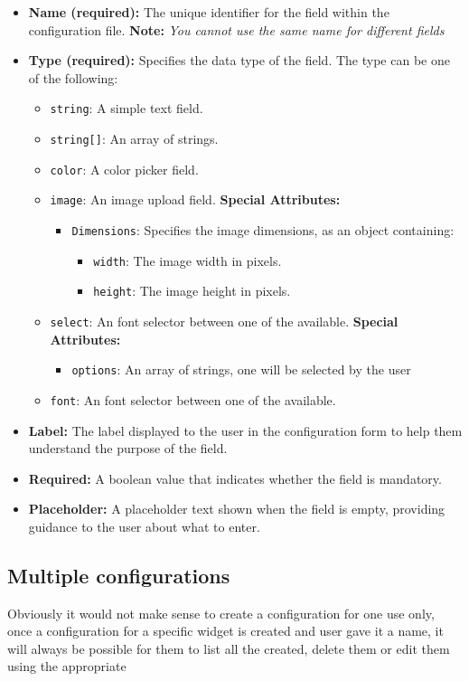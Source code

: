 \begin{itemize}
    \item \textbf{Name (required):} The unique identifier for the field within the configuration file. \textbf{Note:} \textit{You cannot use the same name for different fields}

    \item \textbf{Type (required):} Specifies the data type of the field. The type can be one of the following:
    \begin{itemize}
        \item \texttt{string}: A simple text field.
        \item \texttt{string[]}: An array of strings.
        \item \texttt{color}: A color picker field.
        \item \texttt{image}: An image upload field.
            \textbf{Special Attributes:}
            \begin{itemize}
            \item \texttt{Dimensions}: Specifies the image dimensions, as an object containing:
            \begin{itemize}
                \item \texttt{width}: The image width in pixels.
                \item \texttt{height}: The image height in pixels.
            \end{itemize}
            \end{itemize}
        \item \texttt{select}: An font selector between one of the available.
        \textbf{Special Attributes:}
            \begin{itemize}
            \item \texttt{options}: An array of strings, one will be selected by the user
            \end{itemize}
        \item \texttt{font}: An font selector between one of the available.
    \end{itemize}

    \item \textbf{Label:} The label displayed to the user in the configuration form to help them understand the purpose of the field.

    \item \textbf{Required:} A boolean value that indicates whether the field is mandatory.

    \item \textbf{Placeholder:} A placeholder text shown when the field is empty, providing guidance to the user about what to enter.
\end{itemize}


\subsection{Multiple configurations}
Obviously it would not make sense to create a configuration for one use only, once a configuration for a specific widget is created and user gave it a name, it will always be possible for them to list all the created, delete them or edit them using the appropriate 